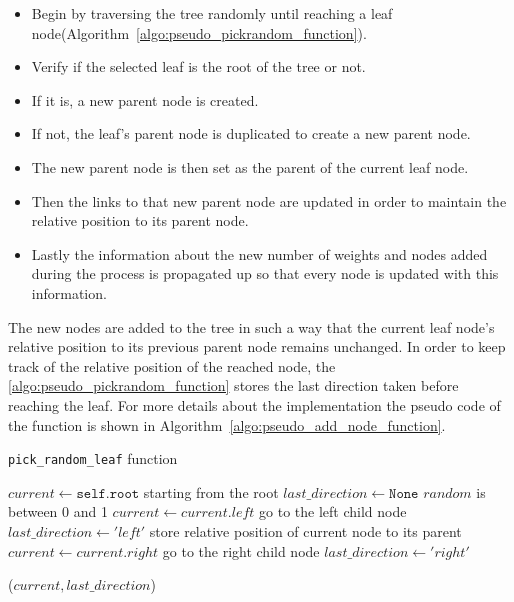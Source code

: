 \begin{itemize}
\item Begin by traversing the tree randomly until reaching a leaf node(Algorithm~\ref{algo:pseudo_pickrandom_function}).
\item Verify if the selected leaf is the root of the tree or not.
\item If it is, a new parent node is created.
\item If not, the leaf's parent node is duplicated to create a new parent node.
\item The new parent node is then set as the parent of the current leaf node.
\item Then the links to that new parent node are updated in order to maintain the relative position to its parent node.
\item Lastly the information about the new number of weights and nodes added during the process is propagated up so that every node is updated with this information.
\end{itemize}

The new nodes are added to the tree in such a way that the current leaf node's relative position to its previous parent node remains unchanged. In order to keep track of the relative position of the reached node, the \ref{algo:pseudo_pickrandom_function} stores the last direction taken before reaching the leaf. For more details about the implementation the pseudo code of the function is shown in Algorithm~\ref{algo:pseudo_add_node_function}.

\begin{algorithm}[!ht]
\caption{\texttt{pick\_random\_leaf} function}
\label{algo:pseudo_pickrandom_function}
\begin{algorithmic}
\State $current \gets \texttt{self.root}$ \Comment starting from the root 
\State $last\_direction \gets \texttt{None}$ 
 \Comment $random$ is between 0 and 1
\State $current \gets current.left$ \Comment go to the left child node
\State $last\_direction \gets 'left'$ \Comment store relative position of current node to its parent
\Else 
\State $current \gets current.right$ \Comment go to the right child node
\State $last\_direction \gets 'right'$ 
\EndIf
\EndWhile

\Return ($current, last\_direction$)
\EndFunction
\end{algorithmic}
\end{algorithm}

